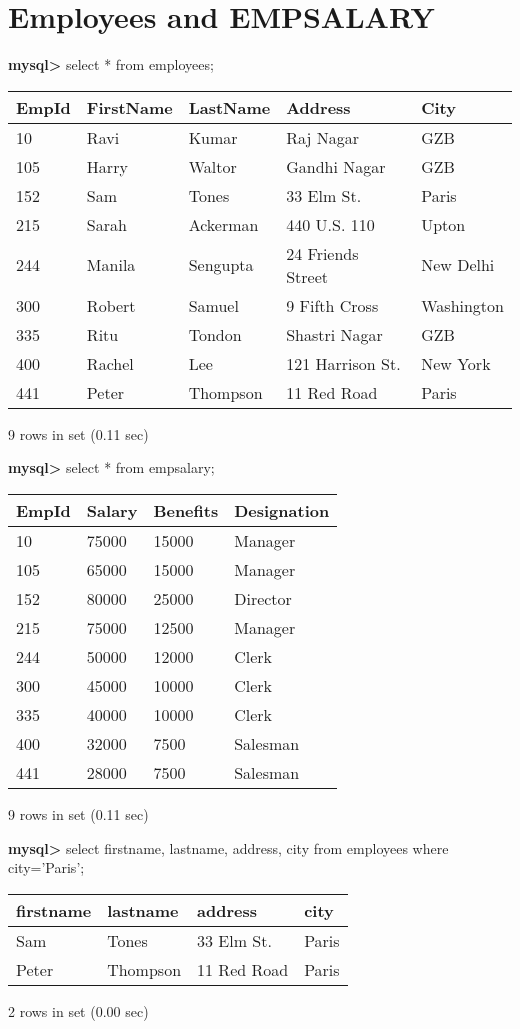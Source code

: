 \documentclass[11pt]{article}
\begin{document}
\section{Employees and EMPSALARY}
\label{sec:org6bc275e}
\textbf{mysql>} select * from employees;
\begin{center}
\begin{tabular}{|l|l|l|l|l|}
\hline
EmpId & FirstName & LastName & Address & City \\
\hline
10 & Ravi & Kumar & Raj Nagar & GZB \\
105 & Harry & Waltor & Gandhi Nagar & GZB \\
152 & Sam & Tones & 33 Elm St. & Paris \\
215 & Sarah & Ackerman & 440 U.S. 110 & Upton \\
244 & Manila & Sengupta & 24 Friends Street & New Delhi \\
300 & Robert & Samuel & 9 Fifth Cross & Washington \\
335 & Ritu & Tondon & Shastri Nagar & GZB \\
400 & Rachel & Lee & 121 Harrison St. & New York \\
441 & Peter & Thompson & 11 Red Road & Paris \\
\hline
\end{tabular}
\end{center}
9 rows in set (0.11 sec)

\textbf{mysql>} select * from empsalary;
\begin{center}
\begin{tabular}{|l|l|l|l|}
\hline
EmpId & Salary & Benefits & Designation \\
\hline
10 & 75000 & 15000 & Manager \\
105 & 65000 & 15000 & Manager \\
152 & 80000 & 25000 & Director \\
215 & 75000 & 12500 & Manager \\
244 & 50000 & 12000 & Clerk \\
300 & 45000 & 10000 & Clerk \\
335 & 40000 & 10000 & Clerk \\
400 & 32000 & 7500 & Salesman \\
441 & 28000 & 7500 & Salesman \\
\hline
\end{tabular}
\end{center}
9 rows in set (0.11 sec)

\textbf{mysql>} select firstname, lastname, address, city from employees where city='Paris';
\begin{center}
\begin{tabular}{|l|l|l|l|}
\hline
firstname & lastname & address & city \\
\hline
Sam & Tones & 33 Elm St. & Paris \\
Peter & Thompson & 11 Red Road & Paris \\
\hline
\end{tabular}
\end{center}
2 rows in set (0.00 sec)
\end{document}
